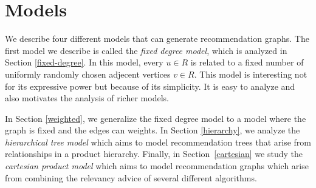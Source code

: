 \section{Models}
We describe four different models that can generate recommendation
graphs. The first model we describe is called the {\em fixed degree
model}, which is analyzed in Section \ref{fixed-degree}. In this
model, every $u\in R$ is related to a fixed number of uniformly
randomly chosen adjecent vertices $v\in R$. This model is interesting
not for its expressive power but because of its simplicity.  It is
easy to analyze and also motivates the analysis of richer models. \vs

In Section \ref{weighted}, we generalize the fixed degree model to a
model where the graph is fixed and the edges can weights. In Section
\ref{hierarchy}, we analyze the {\em hierarchical tree model} which
aims to model recommendation trees that arise from relationships in a
product hierarchy. Finally, in Section~\ref{cartesian} we study the 
{\em cartesian product model} which aims to model recommendation 
graphs which arise from combining the relevancy advice of several 
different algorithms.